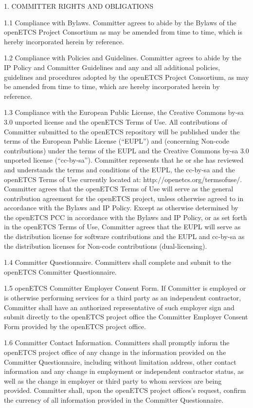 1. COMMITTER RIGHTS AND OBLIGATIONS

1.1 Compliance with Bylaws. Committer agrees to abide by the Bylaws of the openETCS
Project Consortium as may be amended from time to time, which is hereby incorporated
herein by reference.

1.2 Compliance with Policies and Guidelines. Committer agrees to abide by the IP Policy
and Committer Guidelines and any and all additional policies, guidelines and procedures
adopted by the openETCS Project Consortium, as may be amended from time to time, which
are hereby incorporated herein by reference.

1.3 Compliance with the European Public License, the Creative Commons by-sa 3.0
unported license and the openETCS Terms of Use. All contributions of Committer
submitted to the openETCS repository will be published under the terms of the European
Public License (“EUPL”) and (concerning Non-code contributions) under the terms of the
EUPL and the Creative Commons by-sa 3.0 unported license (“cc-by-sa”). Committer
represents that he or she has reviewed and understands the terms and conditions of the
EUPL, the cc-by-sa and the openETCS Terms of Use currently located at:
http://openetcs.org/termsofuse/. Committer agrees that the openETCS Terms of Use will
serve as the general contribution agreement for the openETCS project, unless otherwise
agreed to in accordance with the Bylaws and IP Policy. Except as otherwise determined by
the openETCS PCC in accordance with the Bylaws and IP Policy, or as set forth in the
openETCS Terms of Use, Committer agrees that the EUPL will serve as the distribution
license for software contributions and the EUPL and cc-by-sa as the distribution licenses for
Non-code contributions (dual-licensing).

1.4 Committer Questionnaire. Committers shall complete and submit to the openETCS
Committer Questionnaire.

1.5 openETCS Committer Employer Consent Form. If Committer is employed or is
otherwise performing services for a third party as an independent contractor, Committer shall
have an authorized representative of such employer sign and submit directly to the
openETCS project office the Committer Employer Consent Form provided by the openETCS
project office.

1.6 Committer Contact Information. Committers shall promptly inform the openETCS
project office of any change in the information provided on the Committer Questionnaire,
including without limitation address, other contact information and any change in employment
or independent contractor status, as well as the change in employer or third party to whom
services are being provided. Committer shall, upon the openETCS project offices’s request,
confirm the currency of all information provided in the Committer Questionnaire.

